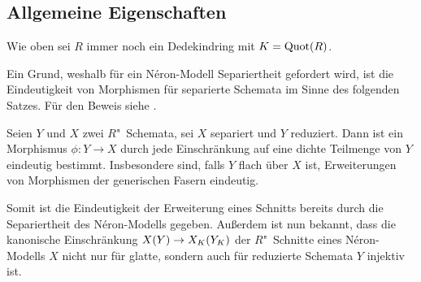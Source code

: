 \subsection{Allgemeine Eigenschaften}
Wie oben sei $R$ immer noch ein Dedekindring mit $K=\operatorname{Quot}(R)$.

Ein Grund, weshalb für ein Néron-Modell Separiertheit gefordert wird,
ist die Eindeutigkeit von Morphismen für separierte Schemata im Sinne
des folgenden Satzes. Für den Beweis siehe
\cite[Corollary~9.9]{wedhorn}.
\begin{Satz}\label{thm:erweindeutig}
  Seien $Y$ und $X$ zwei $R$"~Schemata, sei $X$ separiert und $Y$
  reduziert.
  Dann ist ein Morphismus $\phi\colon Y\to X$ durch jede
  Einschränkung auf eine dichte Teilmenge von $Y$ eindeutig bestimmt.
  Insbesondere sind, falls $Y$ flach über $X$ ist, Erweiterungen von
  Morphismen der generischen Fasern eindeutig.

\end{Satz}
Somit ist die Eindeutigkeit der Erweiterung eines Schnitts bereits
durch die Separiertheit des Néron-Modells gegeben. Außerdem ist nun
bekannt, dass die kanonische Einschränkung $X(Y)\to X_{K}(Y_{K})$ der
$R$"~Schnitte eines Néron-Modells $X$ nicht nur für glatte, sondern
auch für reduzierte Schemata $Y$ injektiv ist.

